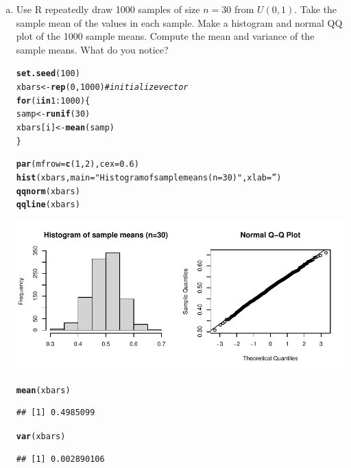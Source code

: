 \documentclass[fleqn]{article}\usepackage[]{graphicx}\usepackage[]{color}
\makeatletter
\def\maxwidth{ %
  \ifdim\Gin@nat@width>\linewidth
    \linewidth
  \else
    \Gin@nat@width
  \fi
}
\newcommand{\hlnum}[1]{\textcolor[rgb]{0.686,0.059,0.569}{#1}}%
\newcommand{\hlstr}[1]{\textcolor[rgb]{0.192,0.494,0.8}{#1}}%
\newcommand{\hlcom}[1]{\textcolor[rgb]{0.678,0.584,0.686}{\textit{#1}}}%
\newcommand{\hlopt}[1]{\textcolor[rgb]{0,0,0}{#1}}%
\newcommand{\hlstd}[1]{\textcolor[rgb]{0.345,0.345,0.345}{#1}}%
\newcommand{\hlkwa}[1]{\textcolor[rgb]{0.161,0.373,0.58}{\textbf{#1}}}%
\newcommand{\hlkwb}[1]{\textcolor[rgb]{0.69,0.353,0.396}{#1}}%
\newcommand{\hlkwc}[1]{\textcolor[rgb]{0.333,0.667,0.333}{#1}}%
\newcommand{\hlkwd}[1]{\textcolor[rgb]{0.737,0.353,0.396}{\textbf{#1}}}%
\newenvironment{kframe}{%
 \def\at@end@of@kframe{}%
 \ifinner\ifhmode%
  \def\at@end@of@kframe{\end{minipage}}%
  \begin{minipage}{\columnwidth}%
 \fi\fi%
 \def\FrameCommand##1{\hskip\@totalleftmargin \hskip-\fboxsep
 \colorbox{shadecolor}{##1}\hskip-\fboxsep
     \hskip-\linewidth \hskip-\@totalleftmargin \hskip\columnwidth}%
 \MakeFramed {\advance\hsize-\width
   \@totalleftmargin\z@ \linewidth\hsize
   \@setminipage}}%
 {\par\unskip\endMakeFramed%
 \at@end@of@kframe}
\newenvironment{knitrout}{}{} %
\makeatother
\begin{document}
\begin{enumerate}[(a)]
\item Use R repeatedly draw 1000 samples of size $n=30$ from $U(0,1)$.  Take the sample mean of the values in each sample.  Make a histogram and normal QQ plot of the 1000 sample means.   Compute the mean and variance of the sample means.  What do you notice?
\begin{knitrout}
\color{fgcolor}\begin{kframe}
\begin{alltt}
\hlkwd{set.seed}\hlstd{(}\hlnum{100}\hlstd{)}
\hlstd{xbars} \hlkwb{<-} \hlkwd{rep}\hlstd{(}\hlnum{0}\hlstd{,} \hlnum{1000}\hlstd{)} \hlcom{# initialize vector }
\hlkwa{for}\hlstd{(i} \hlkwa{in} \hlnum{1}\hlopt{:}\hlnum{1000}\hlstd{) \{}
  \hlstd{samp} \hlkwb{<-} \hlkwd{runif}\hlstd{(}\hlnum{30}\hlstd{)}
  \hlstd{xbars[i]} \hlkwb{<-} \hlkwd{mean}\hlstd{(samp)}
\hlstd{\}}

\hlkwd{par}\hlstd{(}\hlkwc{mfrow}\hlstd{=}\hlkwd{c}\hlstd{(}\hlnum{1}\hlstd{,}\hlnum{2}\hlstd{),} \hlkwc{cex}\hlstd{=}\hlnum{0.6}\hlstd{)}
\hlkwd{hist}\hlstd{(xbars,} \hlkwc{main}\hlstd{=}\hlstr{"Histogram of sample means (n=30)"}\hlstd{,} \hlkwc{xlab}\hlstd{=}\hlstr{''}\hlstd{)}
\hlkwd{qqnorm}\hlstd{(xbars)}
\hlkwd{qqline}\hlstd{(xbars)}
\end{alltt}
\end{kframe}
\includegraphics[width=\maxwidth]{figure/unnamed-chunk-3-1} 
\begin{kframe}\begin{alltt}
\hlkwd{mean}\hlstd{(xbars)}
\end{alltt}
\begin{verbatim}
## [1] 0.4985099
\end{verbatim}
\begin{alltt}
\hlkwd{var}\hlstd{(xbars)}
\end{alltt}
\begin{verbatim}
## [1] 0.002890106
\end{verbatim}
\end{kframe}
\end{knitrout}
\bigskip

% 
% 
\end{enumerate}
\end{document}
